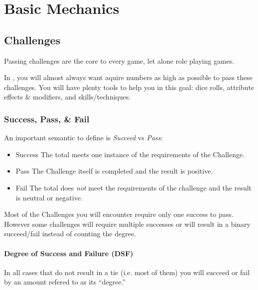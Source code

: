 
\part{Basic Mechanics}

\chapter{Challenges}

Passing challenges are the core to every game, let alone role playing
games. 

In \gametitlemini, you will almost always want aquire numbers as
high as possible to pass these challenges. You will have plenty tools
to help you in this goal: dice rolls, attribute effects \& modifiers,
and skills/techniques. 

\section{Success, Pass, \& Fail}

An important semantic to define is \emph{Succeed} vs \emph{Pass}:
\begin{itemize}
\item Success The total meets one instance of the requirements of the Challenge.
\item Pass The Challenge itself is completed and
the result is positive.
\item Fail The total does \emph{not} meet the requirements
of the challenge and the result is neutral or negative.
\end{itemize}
Most of the Challenges you will encounter require only one success
to pass. However some challenges will require multiple successes or
will result in a binary succeed/fail instead of counting the degree.

\subsection{Degree of Success and Failure (DSF)}

In all cases that do not result in a tie (i.e. most of them) you will
succeed or fail by an amount refered to as its ``degree.'' 

